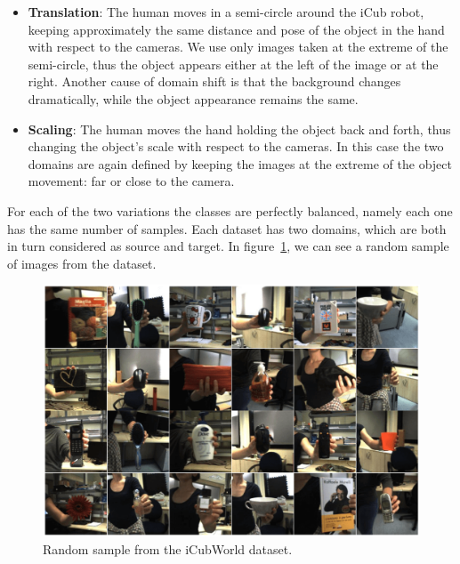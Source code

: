 \documentclass[../main.tex]{subfiles}
\begin{document}
    \begin{itemize}
        \item \textbf{Translation}: The human moves in a semi-circle around the iCub robot, keeping approximately the same
            distance and pose of the object in the hand with respect to the cameras. We use only images taken at the extreme of the
            semi-circle, thus the object appears either at the left of the image or at the right. Another cause of domain shift is
            that the background changes dramatically, while the object appearance remains the same.
        \item \textbf{Scaling}: The human moves the hand holding the object back and forth, thus changing the object's
            scale with respect to the cameras. In this case the two domains are again defined by keeping the images at the extreme of
            the object movement: far or close to the camera.
    \end{itemize}

    For each of the two variations the classes are perfectly balanced, namely each one has the same number of samples. Each dataset
    has two domains, which are both in turn considered as source and target.
    In figure~\ref{fig:icw-samples}, we can see a random sample of images from the dataset.

    \begin{figure}[h!]
        \centering{}
        \includegraphics[width=\linewidth]{./img/icw-samples.png}
        \caption{Random sample from the iCubWorld dataset.}\label{fig:icw-samples}
    \end{figure}
\end{document}
